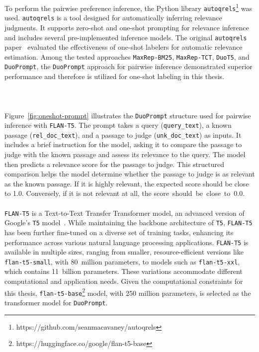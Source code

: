 \noindent To perform the pairwise preference inference, the Python library \texttt{autoqrels}\footnote{https://github.com/seanmacavaney/autoqrels} was used. \texttt{autoqrels} is a tool designed for automatically inferring relevance judgments. It supports zero-shot and one-shot prompting for relevance inference and includes several pre-implemented inference models. The original \texttt{autoqrels} paper~\citep{macavaney:2023} evaluated the effectiveness of one-shot labelers for automatic relevance estimation. Among the tested approaches \texttt{MaxRep-BM25}, \texttt{MaxRep-TCT}, \texttt{DuoT5}, and \texttt{DuoPrompt}, the \texttt{DuoPrompt} approach for pairwise inference demonstrated superior performance and therefore is utilized for one-shot labeling in this thesis.
\\\\\\\\
Figure~\ref{fig:oneshot-prompt} illustrates the \texttt{DuoPrompt} structure used for pairwise inference with \texttt{FLAN-T5}. The prompt takes a query (\texttt{query\_text}), a known passage (\texttt{rel\_doc\_text}), and a passage to judge (\texttt{unk\_doc\_text}) as inputs. It includes a brief instruction for the model, asking it to compare the passage to judge with the known passage and assess its relevance to the query. The model then predicts a relevance score for the passage to judge. This structured comparison helps the model determine whether the passage to judge is as relevant as the known passage. If it is highly relevant, the expected score should be close to 1.0. Conversely, if it is not relevant at all, the \mbox{score should be close to 0.0}.
\\\\
\texttt{FLAN-T5} is a Text-to-Text Transfer Transformer model, an advanced version of Google's \texttt{T5} model~\citep{raffel:2020}. While maintaining the backbone architecture of \texttt{T5}, \texttt{FLAN-T5} has been further fine-tuned on a diverse set of training tasks, enhancing its performance across various natural language processing applications. \texttt{FLAN-T5} is available in multiple sizes, ranging from smaller, resource-efficient versions like \texttt{flan-t5-small}, with 80~million parameters, to models such as \texttt{flan-t5-xxl}, which contains 11~billion parameters. These variations accommodate different computational and application needs. Given the computational constraints for this thesis, \texttt{flan-t5-base}\footnote{https://huggingface.co/google/flan-t5-base} model, with 250 \mbox{million} parameters, is selected as the transformer model for \texttt{DuoPrompt}.
